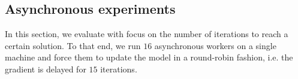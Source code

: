 \subsection{Asynchronous experiments}
\label{sec:async_exp}
In this section, we evaluate \asynctuner with focus on the number of iterations to reach a certain solution. 
To that end, we run $16$ asynchronous workers on a single machine and force them to update the model in a round-robin fashion,
i.e. the gradient is delayed for $15$ iterations.
%     
%
